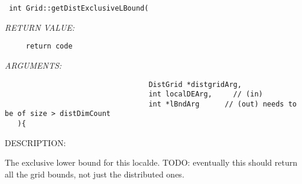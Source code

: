   
\begin{verbatim} int Grid::getDistExclusiveLBound(\end{verbatim}{\em RETURN VALUE:}
\begin{verbatim}     return code\end{verbatim}{\em ARGUMENTS:}
\begin{verbatim}                                  DistGrid *distgridArg, 
                                  int localDEArg,     // (in)
                                  int *lBndArg      // (out) needs to be of size > distDimCount
   ){\end{verbatim}
{\sf DESCRIPTION:\\ }


    The exclusive lower bound for this localde.
   TODO: eventually this should return all the grid bounds, not just
         the distributed ones.
  
\setlength{\parskip}{\oldparskip}
\setlength{\parindent}{\oldparindent}
\setlength{\baselineskip}{\oldbaselineskip}
